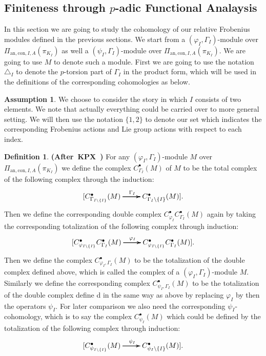 \documentclass[12pt]{amsart}
\theoremstyle{definition}
\newtheorem{definition}[theorem]{Definition}
\numberwithin{equation}{section}
\newtheorem{assumption}[theorem]{Assumption}
\begin{document}
\subsection{Finiteness through $p$-adic Functional Analaysis} \label{section4.1}


\noindent In this section we are going to study the cohomology of our relative Frobenius modules defined in the previous sections. We start from a $(\varphi_I,\Gamma_I)$-module over $\Pi_{\mathrm{an},\mathrm{con},I,A}(\pi_{K_I})$ as well a $(\psi_I,\Gamma_I)$-module over $\Pi_{\mathrm{an},\mathrm{con},I,A}(\pi_{K_I})$. We are going to use $M$ to denote such a module. First we are going to use the notation $\triangle_I$ to denote the $p$-torsion part of $\Gamma_{I}$ in the product form, which will be used in the definitions of the corresponding cohomologies as below.


\begin{assumption} \label{assumption1}
We choose to consider the story in which $I$ consists of two elements. We note that actually everything could be carried over to more general setting. We will then use the notation $\{1,2\}$ to denote our set which indicates the corresponding Frobenius actions and Lie group actions with respect to each index.	
\end{assumption}



\begin{definition} \mbox{\bf{(After KPX \cite[2.3]{KPX})}}
For any $(\varphi_I,\Gamma_I)$-module $M$ over $\Pi_{\mathrm{an},\mathrm{con},I,A}(\pi_{K_I})$ we define the complex $C^\bullet_{\Gamma_I}(M)$ of $M$ to be the total complex of the following complex through the induction:
\[
\xymatrix@R+0pc@C+0pc{
[ C^\bullet_{\Gamma_{I\backslash\{I\}}}(M) \ar[r]^{\Gamma_I} \ar[r] \ar[r]  & C^\bullet_{\Gamma_I\backslash\{I\}}(M)]
.}
\]
Then we define the corresponding double complex $C^\bullet_{\varphi_I}C^\bullet_{\Gamma_I}(M)$ again by taking the corresponding totalization of the following complex through induction:
\[
\xymatrix@R+0pc@C+0pc{
[C^\bullet_{\varphi_{I\backslash\{I\}}}C^\bullet_{\Gamma_{I}}(M) \ar[r]^{\varphi_I} \ar[r] \ar[r]  & C^\bullet_{\varphi_{I\backslash\{I\}}}C^\bullet_{\Gamma_I}(M)]
.}
\]
Then we define the complex $C^\bullet_{\varphi_I,\Gamma_I}(M)$ to be the totalization of the double complex defined above, which is called the complex of a $(\varphi_I,\Gamma_I)$-module $M$. Similarly we define the corresponding complex $C^\bullet_{\psi_I,\Gamma_I}(M)$ to be the totalization of the double complex define  d in the same way as above by replacing $\varphi_I$ by then the operators $\psi_I$. For later comparison we also need the corresponding $\psi_I$-cohomology, which is to say the complex $C^\bullet_{\psi_I}(M)$ which could be defined by the totalization of the following complex through induction:
\[
\xymatrix@R+0pc@C+0pc{
[ C^\bullet_{\psi_{I\backslash\{I\}}}(M) \ar[r]^{\psi_I} \ar[r] \ar[r]  & C^\bullet_{\psi_I\backslash\{I\}}(M)]
.}
\]
\end{definition}
\end{document}
